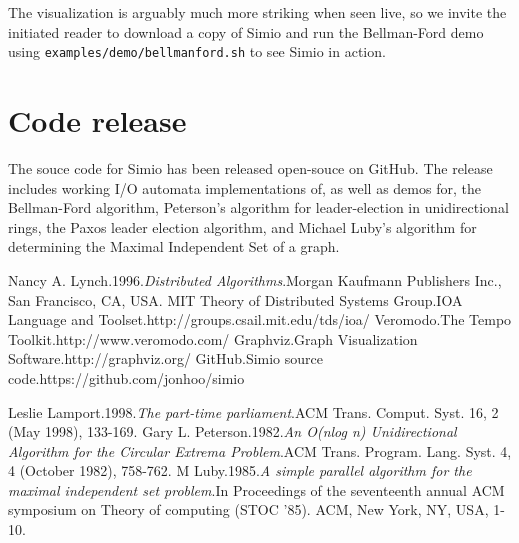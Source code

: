 \documentclass{scrartcl}
\begin{document}
The visualization is arguably much more striking when seen live, so we invite
the initiated reader to download a copy of Simio and run the Bellman-Ford demo
using \texttt{examples/demo/bellmanford.sh} to see Simio in action.

\section{Code release}

The souce code for Simio has been released open-souce on GitHub\cite{simio}.
The release includes working I/O automata implementations of, as well as demos
for, the Bellman-Ford algorithm, Peterson's algorithm for leader-election in
unidirectional rings\cite{peterson}, the Paxos leader election
algorithm\cite{paxos}, and Michael Luby's algorithm for determining the Maximal
Independent Set of a graph\cite{lubymis}.

\begin{thebibliography}{1}
 Nancy A. Lynch.\@ 1996.\@ {\em Distributed Algorithms}.\@ Morgan Kaufmann Publishers Inc., San Francisco, CA, USA. 
 MIT Theory of Distributed Systems Group.\@ IOA Language and Toolset.\@ http://groups.csail.mit.edu/tds/ioa/
 Veromodo.\@ The Tempo Toolkit.\@ http://www.veromodo.com/
 Graphviz.\@ Graph Visualization Software.\@ http://graphviz.org/
 GitHub.\@ Simio source code.\@ https://github.com/jonhoo/simio

 Leslie Lamport.\@ 1998.\@ {\em The part-time parliament}.\@ ACM Trans.  Comput. Syst. 16, 2 (May 1998), 133-169.
 Gary L. Peterson.\@ 1982.\@ {\em An O(nlog n) Unidirectional Algorithm for the Circular Extrema Problem}.\@ ACM Trans. Program. Lang.  Syst. 4, 4 (October 1982), 758-762.
 M Luby.\@ 1985.\@ {\em A simple parallel algorithm for the maximal independent set problem}.\@ In Proceedings of the seventeenth annual ACM symposium on Theory of computing (STOC '85). ACM, New York, NY, USA, 1-10.
\end{thebibliography}
\end{document}

